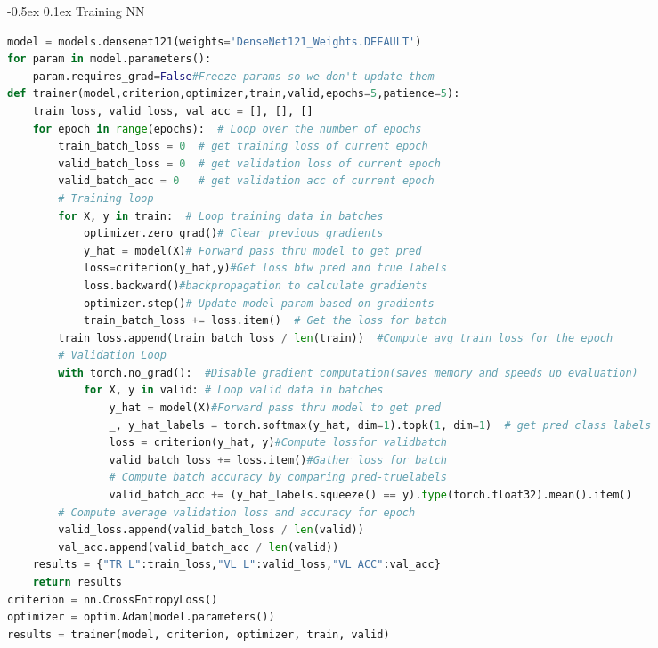 \documentclass[8pt,landscape]{article}
\makeatletter
\renewcommand{\section}{\@startsection{section}{1}{0pt}%
    {-0.5ex}%
    {0.1ex}%
    {\fontsize{8}{9}\bfseries\color{red}}}
\makeatother
\begin{document}
\fontsize{8}{9}\selectfont %
\pagestyle{empty}
\begin{multicols}{3}

\section{Training NN}
\begin{lstlisting}[language=Python]
model = models.densenet121(weights='DenseNet121_Weights.DEFAULT')
for param in model.parameters():  
    param.requires_grad=False#Freeze params so we don't update them
def trainer(model,criterion,optimizer,train,valid,epochs=5,patience=5):
    train_loss, valid_loss, val_acc = [], [], []
    for epoch in range(epochs):  # Loop over the number of epochs
        train_batch_loss = 0  # get training loss of current epoch
        valid_batch_loss = 0  # get validation loss of current epoch
        valid_batch_acc = 0   # get validation acc of current epoch
        # Training loop
        for X, y in train:  # Loop training data in batches
            optimizer.zero_grad()# Clear previous gradients
            y_hat = model(X)# Forward pass thru model to get pred
            loss=criterion(y_hat,y)#Get loss btw pred and true labels
            loss.backward()#backpropagation to calculate gradients
            optimizer.step()# Update model param based on gradients
            train_batch_loss += loss.item()  # Get the loss for batch
        train_loss.append(train_batch_loss / len(train))  #Compute avg train loss for the epoch
        # Validation Loop 
        with torch.no_grad():  #Disable gradient computation(saves memory and speeds up evaluation)
            for X, y in valid: # Loop valid data in batches
                y_hat = model(X)#Forward pass thru model to get pred
                _, y_hat_labels = torch.softmax(y_hat, dim=1).topk(1, dim=1)  # get pred class labels
                loss = criterion(y_hat, y)#Compute lossfor validbatch
                valid_batch_loss += loss.item()#Gather loss for batch
                # Compute batch accuracy by comparing pred-truelabels
                valid_batch_acc += (y_hat_labels.squeeze() == y).type(torch.float32).mean().item()
        # Compute average validation loss and accuracy for epoch
        valid_loss.append(valid_batch_loss / len(valid))
        val_acc.append(valid_batch_acc / len(valid))
    results = {"TR L":train_loss,"VL L":valid_loss,"VL ACC":val_acc}
    return results
criterion = nn.CrossEntropyLoss() 
optimizer = optim.Adam(model.parameters())
results = trainer(model, criterion, optimizer, train, valid)
\end{lstlisting}


\end{multicols}
\end{document}
